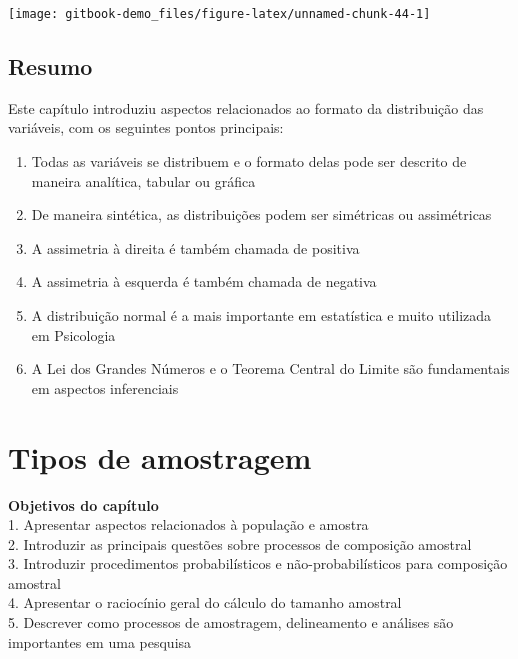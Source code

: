 \documentclass[
]{book}
\providecommand{\tightlist}{%
  \setlength{\itemsep}{0pt}\setlength{\parskip}{0pt}}
\newenvironment{explore}{
  \definecolor{shadecolor}{rgb}{0, 0, 0}  %
  \color{white}
  \begin{shaded}}
 {\end{shaded}}
\newenvironment{objectives}{
  \definecolor{shadecolor}{rgb}{0, 0, 0}  %
  \color{white}
  \begin{shaded}}
 {\end{shaded}}
\begin{document}
\begin{center}\texttt{[image: gitbook-demo\_files/figure-latex/unnamed-chunk-44-1]} \end{center}

\hypertarget{resumo-3}{%
\section{Resumo}\label{resumo-3}}

\begin{explore}

Este capítulo introduziu aspectos relacionados ao formato da distribuição das variáveis, com os seguintes pontos principais:

\begin{enumerate}
\def\labelenumi{\arabic{enumi}.}
\tightlist
\item
  Todas as variáveis se distribuem e o formato delas pode ser descrito de maneira analítica, tabular ou gráfica\\
\item
  De maneira sintética, as distribuições podem ser simétricas ou assimétricas\\
\item
  A assimetria à direita é também chamada de positiva\\
\item
  A assimetria à esquerda é também chamada de negativa\\
\item
  A distribuição normal é a mais importante em estatística e muito utilizada em Psicologia\\
\item
  A Lei dos Grandes Números e o Teorema Central do Limite são fundamentais em aspectos inferenciais\\
\end{enumerate}

\end{explore}

\hypertarget{tipos-de-amostragem}{%
\chapter{Tipos de amostragem}\label{tipos-de-amostragem}}

\begin{objectives}

\textbf{Objetivos do capítulo}\\
1. Apresentar aspectos relacionados à população e amostra\\
2. Introduzir as principais questões sobre processos de composição amostral\\
3. Introduzir procedimentos probabilísticos e não-probabilísticos para composição amostral\\
4. Apresentar o raciocínio geral do cálculo do tamanho amostral\\
5. Descrever como processos de amostragem, delineamento e análises são importantes em uma pesquisa

\end{objectives}
\end{document}
